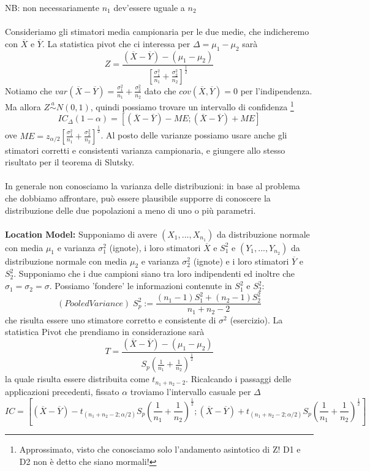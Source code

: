 \noindent NB: non necessariamente $n_1$ dev'essere uguale a $n_2$
\\ \\
Consideriamo gli stimatori media campionaria per le due medie, che indicheremo con $\overline{X}$ e $\overline{Y}$.
La statistica pivot che ci interessa per $\Delta=\mu_1-\mu_2$ sarà $$Z=\frac{(\overline{X} - \overline{Y})-(\mu_1 - \mu_2)}{\left[ \frac{\sigma_1^2}{n_1} + \frac{\sigma_2^2}{n_2} \right]^{\frac{1}{2}}}$$
Notiamo che $var(\overline{X} - \overline{Y})=\frac{\sigma_1^2}{n_1} + \frac{\sigma_2^2}{n_2}$ dato che $cov(\overline{X} , \overline{Y})=0$ per l'indipendenza.
Ma allora $Z \stackrel{a}{\sim} N(0,1)$, quindi possiamo trovare un intervallo di confidenza \footnote{Approssimato, visto che conosciamo solo l'andamento asintotico di Z! D1 e D2 non è detto che siano mormali!}
$$IC_\Delta(1-\alpha)=[(\overline{X} - \overline{Y})-ME;(\overline{X} - \overline{Y})+ME]$$ ove $ME=z_{\alpha/2} \left[ \frac{\sigma_1^2}{n_1} + \frac{\sigma_2^2}{n_2} \right]^{\frac{1}{2}}$.
Al posto delle varianze possiamo usare anche gli stimatori corretti e consistenti varianza campionaria, e giungere allo stesso risultato per il teorema di Slutsky.
\\ \\
In generale non conosciamo la varianza delle distribuzioni: in base al problema che dobbiamo affrontare, può essere plausibile supporre di conoscere la distribuzione delle due popolazioni a meno di uno o più parametri. \\ \\ 
\textbf{Location Model:} Supponiamo di avere $(X_1,...,X_{n_1})$ da distribuzione normale con media $\mu_1$ e varianza $\sigma_1^2$ (ignote), i loro stimatori $\overline{X}$ e $S^2_1$ e
 $(Y_1,...,Y_{n_2})$ da distribuzione normale con media $\mu_2$ e varianza $\sigma_2^2$ (ignote) e i loro stimatori $\overline{Y}$ e $S^2_2$. Supponiamo che i due campioni siano tra loro indipendenti ed inoltre che $\sigma_1=\sigma_2=\sigma$.
Possiamo 'fondere' le informazioni contenute in $S^2_1$ e $S^2_2$: $$(Pooled Variance) \; S^2_p:= \frac{(n_1 - 1)S^2_1 + (n_2 - 1)S^2_2}{n_1 + n_2 - 2} $$ 
che risulta essere uno stimatore corretto e consistente di $\sigma^2$ (esercizio).
La statistica Pivot che prendiamo in considerazione sarà $$T=\frac{(\overline{X} - \overline{Y})-(\mu_1 - \mu_2)}{S_p \left(\frac{1}{n_1} + \frac{1}{n_2} \right)^{\frac{1}{2}}}$$ la quale risulta essere distribuita come $t_{n_1 + n_2 - 2}$. Ricalcando i passaggi delle applicazioni precedenti, fissato $\alpha$  troviamo l'intervallo casuale per $\Delta$ $$IC = \left[(\overline{X} - \overline{Y}) - t_{(n_1 + n_2 - 2;\alpha / 2)} S_p \left(\frac{1}{n_1} + \frac{1}{n_2} \right)^{\frac{1}{2}} ; (\overline{X} - \overline{Y}) + t_{(n_1 + n_2 - 2;\alpha / 2)} S_p \left(\frac{1}{n_1} + \frac{1}{n_2} \right)^{\frac{1}{2}} \right]$$

